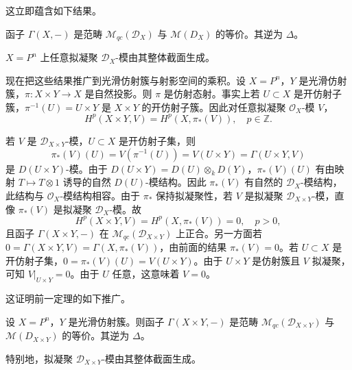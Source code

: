 这立即蕴含如下结果。

\begin{theorem}
函子 $\Gamma(X,-)$ 是范畴 $\mathcal{M}_{qc}(\mathcal{D}_X)$ 与 $\mathcal{M}(D_X)$ 的等价。其逆为 $\Delta$。
\end{theorem}

\begin{corollary}
$X=P^n$ 上任意拟凝聚 $\mathcal{D}_X$-模由其整体截面生成。
\end{corollary}

现在把这些结果推广到光滑仿射簇与射影空间的乘积。设 $X=P^n$，$Y$ 是光滑仿射簇，$\pi:X\times Y\to X$ 是自然投影。则 $\pi$ 是仿射态射。事实上若 $U\subset X$ 是开仿射子簇，$\pi^{-1}(U)=U\times Y$ 是 $X\times Y$ 的开仿射子簇。因此对任意拟凝聚 $\mathcal{O}_X$-模 $V$，
$$H^p(X\times Y,V)=H^p(X,\pi_*(V)),\quad p\in\mathbb{Z}.$$

若 $V$ 是 $\mathcal{D}_{X\times Y}$-模，$U\subset X$ 是开仿射子集，则
$$\pi_*(V)(U)=V(\pi^{-1}(U))=V(U\times Y)=\Gamma(U\times Y,V)$$
是 $D(U\times Y)$-模。由于 $D(U\times Y)=D(U)\otimes_kD(Y)$，$\pi_*(V)(U)$ 有由映射 $T\longmapsto T\otimes1$ 诱导的自然 $D(U)$-模结构。因此 $\pi_*(V)$ 有自然的 $\mathcal{D}_X$-模结构，此结构与 $\mathcal{O}_X$-模结构相容。由于 $\pi_*$ 保持拟凝聚性，若 $V$ 是拟凝聚 $\mathcal{D}_{X\times Y}$-模，直像 $\pi_*(V)$ 是拟凝聚 $\mathcal{D}_X$-模。故
$$H^p(X\times Y,V)=H^p(X,\pi_*(V))=0,\quad p>0,$$
且函子 $\Gamma(X\times Y,-)$ 在 $\mathcal{M}_{qc}(\mathcal{D}_{X\times Y})$ 上正合。另一方面若 $0=\Gamma(X\times Y,V)=\Gamma(X,\pi_*(V))$，由前面的结果 $\pi_*(V)=0$。若 $U\subset X$ 是开仿射子集，$0=\pi_*(V)(U)=V(U\times Y)$。由于 $U\times Y$ 是仿射簇且 $V$ 拟凝聚，可知 $V|_{U\times Y}=0$。由于 $U$ 任意，这意味着 $V=0$。

这证明前一定理的如下推广。

\begin{theorem}
设 $X=P^n$，$Y$ 是光滑仿射簇。则函子 $\Gamma(X\times Y,-)$ 是范畴 $\mathcal{M}_{qc}(\mathcal{D}_{X\times Y})$ 与 $\mathcal{M}(D_{X\times Y})$ 的等价。其逆为 $\Delta$。
\end{theorem}

特别地，拟凝聚 $\mathcal{D}_{X\times Y}$-模由其整体截面生成。